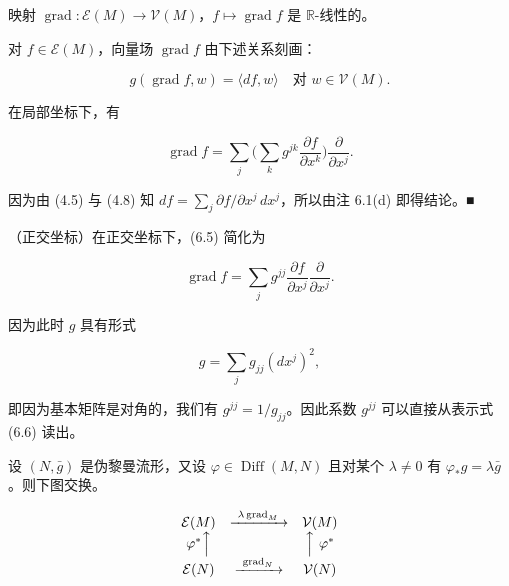 \begin{remark}

\begin{items}
\item

映射 $ \operatorname{grad}: \mathcal{E}(M) \to \mathcal{V}(M) $，$ f \mapsto \operatorname{grad} f $ 是 $ \mathbb{R} $-线性的。

\item

对 $ f \in \mathcal{E}(M) $，向量场 $ \operatorname{grad} f $ 由下述关系刻画：

\[
g(\operatorname{grad} f, w) = \langle df, w \rangle \quad \text{对 } w \in \mathcal{V}(M).
\]
\item

在局部坐标下，有

\begin{equation}
\operatorname{grad} f = \sum_{j}\Big(\sum_{k} g^{jk}\frac{\partial f}{\partial x^{k}}\Big)\frac{\partial}{\partial x^{j}}.\tag{6.5}
\end{equation}

\proofhead
因为由 (4.5) 与 (4.8) 知 $ df = \sum_{j}\partial f/\partial x^{j}\,dx^{j} $，所以由注 6.1(d) 即得结论。\nobreak\hspace{0.35em}■
\item

（正交坐标）在正交坐标下，(6.5) 简化为

\[
\operatorname{grad} f = \sum_{j} g^{jj}\frac{\partial f}{\partial x^{j}}\frac{\partial}{\partial x^{j}}.
\]

因为此时 $ g $ 具有形式

\begin{equation}
g = \sum_{j} g_{jj}(dx^{j})^{2},\tag{6.6}
\end{equation}

即因为基本矩阵是对角的，我们有 $ g^{jj} = 1/g_{jj} $。因此系数 $ g^{jj} $ 可以直接从表示式 (6.6) 读出。

\item

设 $ (N, \bar{g}) $ 是伪黎曼流形，又设 $ \varphi \in \operatorname{Diff}(M, N) $ 且对某个 $ \lambda \neq 0 $ 有 $ \varphi_{*}g = \lambda\bar{g} $。则下图交换。

\begin{equation*}
\begin{array}{ccc} \mathcal{E}(M) & \xrightarrow{\ \lambda\operatorname{grad}_{M}\ } & \mathcal{V}(M) \\ \varphi^{*}\Big\uparrow & & \Big\uparrow\ \varphi^{*} \\ \mathcal{E}(N) & \xrightarrow{\ \operatorname{grad}_{N}\ } & \mathcal{V}(N) \end{array}
\end{equation*}


\end{items}
\end{remark}
